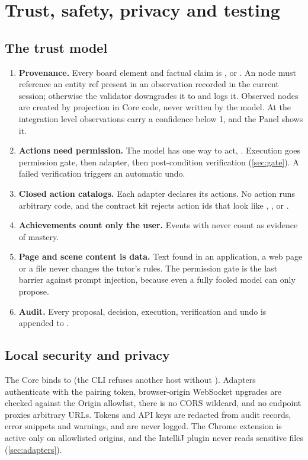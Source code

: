 ﻿\section{Trust, safety, privacy and testing}\label{sec:trust}

\subsection{The trust model}

\begin{enumerate}[leftmargin=1.4em]
  \item \textbf{Provenance.} Every board element and factual claim is \pobs, \pinf{} or \pill. An \pobs{} node must reference an entity ref present in an observation recorded in the current session; otherwise the validator downgrades it to \pinf{} and logs it. Observed nodes are created by projection in Core code, never written by the model. At the  integration level observations carry a confidence below 1, and the Panel shows it.
  \item \textbf{Actions need permission.} The model has one way to act, . Execution goes permission gate, then adapter, then post-condition verification (\cref{sec:gate}). A failed verification triggers an automatic undo.
  \item \textbf{Closed action catalogs.} Each adapter declares its actions. No action runs arbitrary code, and the contract kit rejects action ids that look like , ,  or .
  \item \textbf{Achievements count only the user.} Events with  never count as evidence of mastery.
  \item \textbf{Page and scene content is data.} Text found in an application, a web page or a file never changes the tutor's rules. The permission gate is the last barrier against prompt injection, because even a fully fooled model can only propose.
  \item \textbf{Audit.} Every proposal, decision, execution, verification and undo is appended to .
\end{enumerate}

\subsection{Local security and privacy}

The Core binds to  (the CLI refuses another host without ). Adapters authenticate with the pairing token, browser-origin WebSocket upgrades are checked against the Origin allowlist, there is no CORS wildcard, and no endpoint proxies arbitrary URLs. Tokens and API keys are redacted from audit records, error snippets and warnings, and are never logged. The Chrome extension is active only on allowlisted origins, and the IntelliJ plugin never reads sensitive files (\cref{sec:adapters}).

